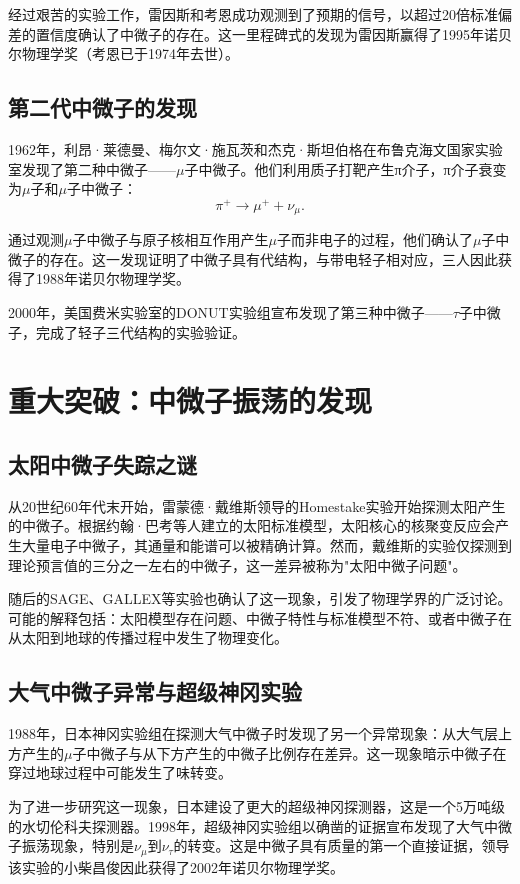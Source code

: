 \documentclass[12pt, a4paper]{article}
\begin{document}
经过艰苦的实验工作，雷因斯和考恩成功观测到了预期的信号，以超过20倍标准偏差的置信度确认了中微子的存在。这一里程碑式的发现为雷因斯赢得了1995年诺贝尔物理学奖（考恩已于1974年去世）。

\subsection{第二代中微子的发现}
1962年，利昂·莱德曼、梅尔文·施瓦茨和杰克·斯坦伯格在布鲁克海文国家实验室发现了第二种中微子——$\mu$子中微子。他们利用质子打靶产生π介子，π介子衰变为$\mu$子和$\mu$子中微子：
$$\pi^+ \to \mu^+ + \nu_\mu.$$

通过观测$\mu$子中微子与原子核相互作用产生$\mu$子而非电子的过程，他们确认了$\mu$子中微子的存在。这一发现证明了中微子具有代结构，与带电轻子相对应，三人因此获得了1988年诺贝尔物理学奖。

2000年，美国费米实验室的DONUT实验组宣布发现了第三种中微子——$\tau$子中微子，完成了轻子三代结构的实验验证。

\section{重大突破：中微子振荡的发现}
\subsection{太阳中微子失踪之谜}
从20世纪60年代末开始，雷蒙德·戴维斯领导的Homestake实验开始探测太阳产生的中微子。根据约翰·巴考等人建立的太阳标准模型，太阳核心的核聚变反应会产生大量电子中微子，其通量和能谱可以被精确计算。然而，戴维斯的实验仅探测到理论预言值的三分之一左右的中微子，这一差异被称为"太阳中微子问题"。

随后的SAGE、GALLEX等实验也确认了这一现象，引发了物理学界的广泛讨论。可能的解释包括：太阳模型存在问题、中微子特性与标准模型不符、或者中微子在从太阳到地球的传播过程中发生了物理变化。

\subsection{大气中微子异常与超级神冈实验}
1988年，日本神冈实验组在探测大气中微子时发现了另一个异常现象：从大气层上方产生的$\mu$子中微子与从下方产生的中微子比例存在差异。这一现象暗示中微子在穿过地球过程中可能发生了味转变。

为了进一步研究这一现象，日本建设了更大的超级神冈探测器，这是一个5万吨级的水切伦科夫探测器。1998年，超级神冈实验组以确凿的证据宣布发现了大气中微子振荡现象，特别是$\nu_\mu$到$\nu_\tau$的转变。这是中微子具有质量的第一个直接证据，领导该实验的小柴昌俊因此获得了2002年诺贝尔物理学奖。
\end{document}
